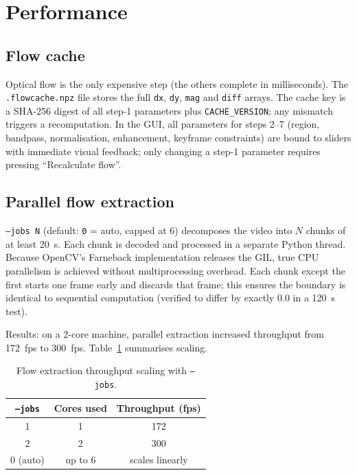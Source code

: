 \documentclass[12pt,a4paper]{article}
\begin{document}
\section{Performance}
\label{sec:perf}

\subsection{Flow cache}

Optical flow is the only expensive step (the others complete in milliseconds).
The \texttt{.flowcache.npz} file stores the full \texttt{dx}, \texttt{dy},
\texttt{mag} and \texttt{diff} arrays. The cache key is a SHA-256 digest of all
step-1 parameters plus \texttt{CACHE\_VERSION}; any mismatch triggers a
recomputation. In the GUI, all parameters for steps 2--7 (region, bandpass,
normalisation, enhancement, keyframe constraints) are bound to sliders with
immediate visual feedback; only changing a step-1 parameter requires pressing
``Recalculate flow''.

\subsection{Parallel flow extraction}

\texttt{--jobs N} (default: \texttt{0} = auto, capped at 6) decomposes the
video into $N$ chunks of at least 20~s. Each chunk is decoded and processed in
a separate Python thread. Because OpenCV's Farneback implementation releases
the GIL, true CPU parallelism is achieved without multiprocessing overhead.
Each chunk except the first starts one frame early and discards that frame;
this ensures the boundary is identical to sequential computation (verified to
differ by exactly 0.0 in a 120~s test).

Results: on a 2-core machine, parallel extraction increased throughput from
172~fps to 300~fps. Table~\ref{tab:jobs} summarises scaling.

\begin{table}[H]
\centering
\caption{Flow extraction throughput scaling with \texttt{--jobs}.}
\label{tab:jobs}
\begin{tabular}{@{}ccc@{}}
\toprule
\texttt{--jobs} & Cores used & Throughput (fps) \\
\midrule
1 & 1 & 172 \\
2 & 2 & 300 \\
0 (auto) & up to 6 & scales linearly \\
\bottomrule
\end{tabular}
\end{table}
\end{document}
